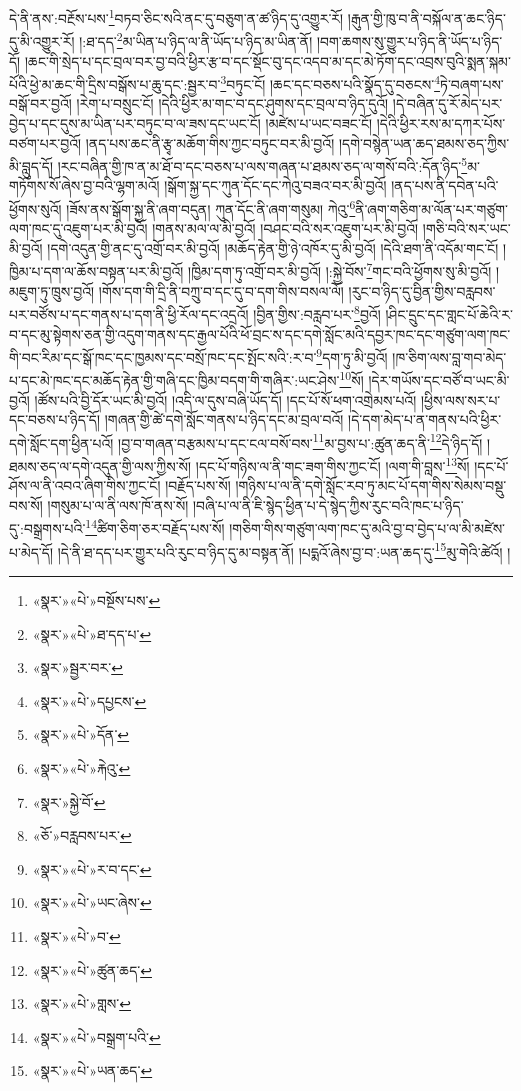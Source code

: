 དེ་ནི་ནས་:བརྔོས་པས་\footnote{«སྣར་»«པེ་»བསྔོས་པས་}བཏབ་ཅིང་སའི་ནང་དུ་བཅུག་ན་ཚ་ཉིད་དུ་འགྱུར་རོ། །རྒུན་གྱི་ཁུ་བ་ནི་བསྐོལ་ན་ཆང་ཉིད་དུ་མི་འགྱུར་རོ། །:ཐ་དད་\footnote{«སྣར་»«པེ་»ཐ་དད་པ་}མ་ཡིན་པ་ཉིད་ལ་ནི་ཡོད་པ་ཉིད་མ་ཡིན་ནོ། །བག་ཆགས་སུ་གྱུར་པ་ཉིད་ནི་ཡོད་པ་ཉིད་དོ། །ཆང་གི་སྲེད་པ་དང་བྲལ་བར་བྱ་བའི་ཕྱིར་རྩ་བ་དང་སྡོང་བུ་དང་འདབ་མ་དང་མེ་ཏོག་དང་འབྲས་བུའི་སྨན་སྐམ་པོའི་ཕྱེ་མ་ཆང་གི་དྲིས་བསྒོས་པ་ཆུ་དང་:སྦྱར་བ་\footnote{«སྣར་»སྦྱར་བར་}བཏུང་ངོ། །ཆང་དང་བཅས་པའི་སྣོད་དུ་བཅངས་\footnote{«སྣར་»«པེ་»དཔྱངས་}ཏེ་བཞག་པས་བསྒོ་བར་བྱའོ། །རེག་པ་བསྲུང་ངོ། །དེའི་ཕྱིར་མ་གང་བ་དང་ཤུགས་དང་བྲལ་བ་ཉིད་དུའོ། །དེ་བཞིན་དུ་རོ་མེད་པར་བྱེད་པ་དང་དུས་མ་ཡིན་པར་བཏུང་བ་ལ་ཟས་དང་ཡང་ངོ། །མཛེས་པ་ཡང་བཟང་ངོ། །དེའི་ཕྱིར་རས་མ་དཀར་པོས་བཙག་པར་བྱའོ། །ནད་པས་ཆང་ནི་རྩྭ་མཆོག་གིས་ཀྱང་བཏུང་བར་མི་བྱའོ། །དགེ་བསྙེན་ཡན་ཆད་ཐམས་ཅད་ཀྱིས་མི་བླུད་དོ། །རང་བཞིན་གྱི་ཁ་ན་མ་ཐོ་བ་དང་བཅས་པ་ལས་གཞན་པ་ཐམས་ཅད་ལ་གསོ་བའི་:དོན་ཉིད་\footnote{«སྣར་»«པེ་»དོན་}མ་གཏོགས་སོ་ཞེས་བྱ་བའི་ལྷག་མའོ། །སྒོག་སྐྱ་དང་ཀུན་དོང་དང་ཀེའུ་བཟའ་བར་མི་བྱའོ། །ནད་པས་ནི་དབེན་པའི་ཕྱོགས་སུའོ། །ཟོས་ནས་སྒོག་སྐྱ་ནི་ཞག་བདུན། ཀུན་དོང་ནི་ཞག་གསུམ། ཀེའུ་\footnote{«སྣར་»«པེ་»རྐེའུ་}ནི་ཞག་གཅིག་མ་ལོན་པར་གཙུག་ལག་ཁང་དུ་འཇུག་པར་མི་བྱའོ། །གནས་མལ་ལ་མི་བྱའོ། །བཤང་བའི་སར་འཇུག་པར་མི་བྱའོ། །གཅི་བའི་སར་ཡང་མི་བྱའོ། །དགེ་འདུན་གྱི་ནང་དུ་འགྲོ་བར་མི་བྱའོ། །མཆོད་རྟེན་གྱི་ཉེ་འཁོར་དུ་མི་བྱའོ། །དེའི་ཐག་ནི་འདོམ་གང་ངོ། །ཁྱིམ་པ་དག་ལ་ཆོས་བསྟན་པར་མི་བྱའོ། །ཁྱིམ་དག་ཏུ་འགྲོ་བར་མི་བྱའོ། །:སྐྱེ་བོས་\footnote{«སྣར་»སྐྱེ་བོ་}གང་བའི་ཕྱོགས་སུ་མི་བྱའོ། །མཇུག་ཏུ་ཁྲུས་བྱའོ། །གོས་དག་གི་དྲི་ནི་བཀྲུ་བ་དང་དུ་བ་དག་གིས་བསལ་ལོ། །རུང་བ་ཉིད་དུ་བྱིན་གྱིས་བརླབས་པར་བཙོས་པ་དང་གནས་པ་དག་ནི་ཕྱི་རོལ་དང་འདྲའོ། །བྱིན་གྱིས་:བརླབ་པར་\footnote{«ཅོ་»བརླབས་པར་}བྱའོ། །ཤིང་དྲུང་དང་གླང་པོ་ཆེའི་ར་བ་དང་མུ་སྟེགས་ཅན་གྱི་འདུག་གནས་དང་རྒྱལ་པོའི་ཕོ་བྲང་ས་དང་དགེ་སློང་མའི་དབྱར་ཁང་དང་གཙུག་ལག་ཁང་གི་བང་རིམ་དང་སྒོ་ཁང་དང་ཁྱམས་དང་བསྲོ་ཁང་དང་སྤོང་སའི་:ར་བ་\footnote{«སྣར་»«པེ་»ར་བ་དང་}དག་ཏུ་མི་བྱའོ། །ཁ་ཅིག་ལས་བླ་གབ་མེད་པ་དང་མེ་ཁང་དང་མཆོད་རྟེན་གྱི་གཞི་དང་ཁྱིམ་བདག་གི་གཞིར་:ཡང་ཤེས་\footnote{«སྣར་»«པེ་»ཡང་ཞེས་}སོ། །དེར་གཡོས་དང་བཙོ་བ་ཡང་མི་བྱའོ། །ཚོས་པའི་བྱི་དོར་ཡང་མི་བྱའོ། །འདི་ལ་དུས་བཞི་ཡོད་དོ། །དང་པོ་སོ་ཕག་འགྲེམས་པའོ། །ཕྱིས་ལས་སར་པ་དང་བཅས་པ་ཉིད་དོ། །གཞན་གྱི་ཚེ་དགེ་སློང་གནས་པ་ཉིད་དང་མ་བྲལ་བའོ། །དེ་དག་མེད་པ་ན་གནས་པའི་ཕྱིར་དགེ་སློང་དག་ཕྱིན་པའོ། །བྱ་བ་གཞན་བརྩམས་པ་དང་ངལ་བསོ་བས་\footnote{«སྣར་»«པེ་»བ་}མ་བྱས་པ་:ཚུན་ཆད་ནི་\footnote{«སྣར་»«པེ་»ཚུན་ཆད་}དེ་ཉིད་དོ། །ཐམས་ཅད་ལ་དགེ་འདུན་གྱི་ལས་ཀྱིས་སོ། །དང་པོ་གཉིས་ལ་ནི་གང་ཟག་གིས་ཀྱང་ངོ། །ལག་གི་བླས་\footnote{«སྣར་»«པེ་»གླས་}སོ། །དང་པོ་ཤོས་ལ་ནི་འབའ་ཞིག་གིས་ཀྱང་ངོ། །བརྗོད་པས་སོ། །གཉིས་པ་ལ་ནི་དགེ་སློང་རབ་ཏུ་མང་པོ་དག་གིས་སེམས་བསྡུ་བས་སོ། །གསུམ་པ་ལ་ནི་ལས་ཁོ་ནས་སོ། །བཞི་པ་ལ་ནི་ཇི་སྙེད་ཕྱིན་པ་དེ་སྙེད་ཀྱིས་རུང་བའི་ཁང་པ་ཉིད་དུ་:བསྒྲགས་པའི་\footnote{«སྣར་»«པེ་»བསྒྲག་པའི་}ཚིག་ཅིག་ཅར་བརྗོད་པས་སོ། །གཅིག་གིས་གཙུག་ལག་ཁང་དུ་མའི་བྱ་བ་བྱེད་པ་ལ་མི་མཛེས་པ་མེད་དོ། །དེ་ནི་ཐ་དད་པར་གྱུར་པའི་རུང་བ་ཉིད་དུ་མ་བསྟན་ནོ། །པདྨའོ་ཞེས་བྱ་བ་:ཡན་ཆད་དུ་\footnote{«སྣར་»«པེ་»ཡན་ཆད་}མུ་གེའི་ཚེའོ། །
